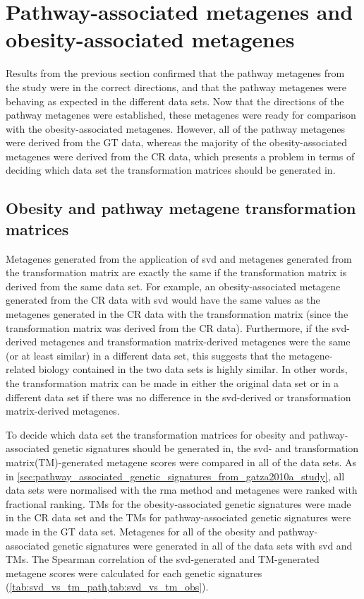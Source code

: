 \section{Pathway-associated metagenes and obesity-associated metagenes}
\label{sec:pathway_associated_metagenes_and_obesity_associated_metagenes}

Results from the previous section confirmed that the pathway metagenes from the \citet{Gatza2010a} study were in the correct directions, and that the pathway metagenes were behaving as expected in the different data sets.
Now that the directions of the pathway metagenes were established, these metagenes were ready for comparison with the obesity-associated metagenes.
However, all of the pathway metagenes were derived from the GT data, whereas the majority of the obesity-associated metagenes were derived from the CR data, which presents a problem in terms of deciding which data set the transformation matrices should be generated in.

\subsection{Obesity and pathway metagene transformation matrices}
\label{sub:obesity_and_pathway_metagene_transformation_matrices}

Metagenes generated from the application of \gls{svd} and metagenes generated from the transformation matrix are exactly the same if the transformation matrix is derived from the same data set.
For example, an obesity-associated metagene generated from the CR data with \gls{svd} would have the same values as the metagenes generated in the CR data with the transformation matrix (since the transformation matrix was derived from the CR data).
Furthermore, if the \gls{svd}-derived metagenes and transformation matrix-derived metagenes were the same (or at least similar) in a different data set, this suggests that the metagene-related biology contained in the two data sets is highly similar.
In other words, the transformation matrix can be made in either the original data set or in a different data set if there was no difference in the \gls{svd}-derived or transformation matrix-derived metagenes.

To decide which data set the transformation matrices for obesity and pathway-associated genetic signatures should be generated in, the \gls{svd}- and transformation matrix(TM)-generated metagene scores were compared in all of the data sets.
As in \cref{sec:pathway_associated_genetic_signatures_from_gatza2010a_study}, all data sets were normalised with the \gls{rma} method and metagenes were ranked with fractional ranking.
TMs for the obesity-associated genetic signatures were made in the CR data set and the TMs for pathway-associated genetic signatures were made in the GT data set.
Metagenes for all of the obesity and pathway-associated genetic signatures were generated in all of the data sets with \gls{svd} and TMs.
The Spearman correlation of the \gls{svd}-generated and TM-generated metagene scores were calculated for each genetic signatures (\cref{tab:svd_vs_tm_path,tab:svd_vs_tm_obs}).

